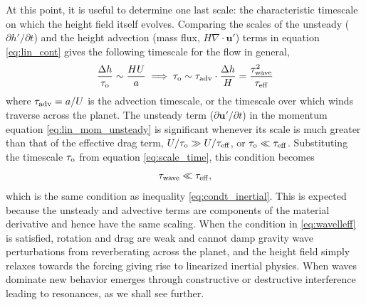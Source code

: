 \documentclass[trackchanges,twocolumn]{aastex7}
\begin{document}
At this point, it is useful to determine one last scale: the characteristic timescale on which the height field itself evolves. Comparing the scales of the unsteady ($\partial h'/\partial t$) and the height advection (mass flux, $H\nabla\cdot\mathbf{u}'$) terms in equation \eqref{eq:lin_cont} gives the following timescale for the flow in general,
\begin{equation}
    \frac{\Delta h}{\tau_{\rm o}} \sim \frac{HU}{a} \implies \tau_{\rm o} \sim \tau_{\rm adv} \cdot \frac{\Delta h}{H} = \frac{\tau_{\rm wave}^2}{\tau_{\rm eff}} \label{eq:scale_time}
\end{equation}
where $\tau_{\rm adv} = a/U$ is the advection timescale, or the timescale over which winds traverse across the planet. The unsteady term ($\partial \mathbf{u}'/\partial t$) in the momentum equation \eqref{eq:lin_mom_unsteady} is significant whenever its scale is much greater than that of the effective drag term, $U/\tau_{\rm o} \gg U/\tau_{\rm eff}$, or $\tau_{\rm o} \ll \tau_{\rm eff}$. Substituting the timescale $\tau_{\rm o}$ from equation \eqref{eq:scale_time}, this condition becomes
\begin{equation}
    \tau_{\rm wave} \ll \tau_{\rm eff},
    \label{eq:wavelleff}
\end{equation}
which is the same condition as inequality \eqref{eq:condt_inertial}. This is expected because the unsteady and advective terms are components of the material derivative and hence have the same scaling. When the condition in \eqref{eq:wavelleff} is satisfied, rotation and drag are weak and cannot damp gravity wave perturbations from reverberating across the planet, and the height field simply relaxes towards the forcing giving rise to linearized inertial physics. When waves dominate new behavior emerges through constructive or destructive interference leading to resonances, as we shall see further. 
\end{document}
